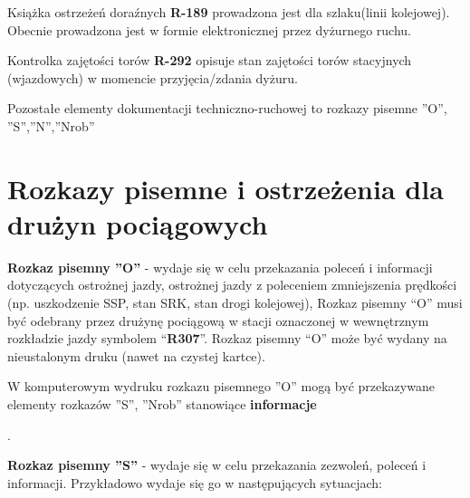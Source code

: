 Książka ostrzeżeń doraźnych \textbf{R-189} prowadzona jest dla szlaku(linii kolejowej). Obecnie prowadzona jest w formie elektronicznej przez dyżurnego ruchu.

Kontrolka zajętości torów \textbf{R-292} opisuje stan zajętości torów stacyjnych (wjazdowych) w momencie przyjęcia/zdania dyżuru.

Pozostałe elementy dokumentacji techniczno-ruchowej to rozkazy pisemne ''O'', ''S'',''N'',''Nrob''

\chapter{Rozkazy pisemne i ostrzeżenia dla drużyn pociągowych}

\textbf{Rozkaz pisemny ''O''} - wydaje się w celu przekazania poleceń i informacji dotyczących ostrożnej jazdy, ostrożnej
jazdy z poleceniem zmniejszenia prędkości (np. uszkodzenie SSP, stan SRK, stan drogi kolejowej), Rozkaz pisemny “O”
musi być odebrany przez drużynę pociągową w stacji oznaczonej w wewnętrznym rozkładzie jazdy symbolem “\textbf{R307}”.
Rozkaz pisemny “O” może być wydany na nieustalonym druku (nawet na czystej kartce).  \begin{tcolorbox}[colback=green!5!white,colframe=green!45!black,width=10cm,title=Rozkaz pisemny ''O'']
	W komputerowym wydruku rozkazu pisemnego ''O'' mogą być przekazywane elementy rozkazów ''S'', ''Nrob'' stanowiące \textbf{informacje}
\end{tcolorbox}
 . 

\textbf{Rozkaz pisemny ''S''} - wydaje się w celu przekazania zezwoleń, poleceń i informacji. Przykładowo wydaje się go w
następujących sytuacjach:

